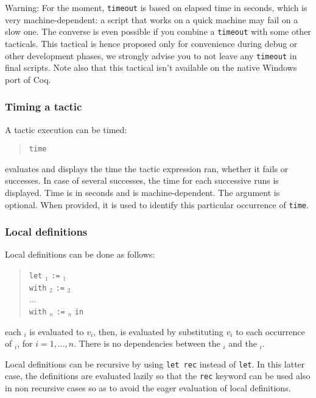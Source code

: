 Warning: For the moment, {\tt timeout} is based on elapsed time in
seconds, which is very
machine-dependent: a script that works on a quick machine may fail
on a slow one. The converse is even possible if you combine a
{\tt timeout} with some other tacticals. This tactical is hence
proposed only for convenience during debug or other development
phases, we strongly advise you to not leave any {\tt timeout} in
final scripts. Note also that this tactical isn't available on
the native Windows port of Coq.

\subsubsection{Timing a tactic
}

A tactic execution can be timed:
\begin{quote}
 {\tt time} {\qstring} {\tacexpr}
\end{quote}
evaluates {\tacexpr}
and displays the time the tactic expression ran, whether it fails or
successes. In case of several successes, the time for each successive
runs is displayed. Time is in seconds and is machine-dependent. The
{\qstring} argument is optional. When provided, it is used to identify
this particular occurrence of {\tt time}.

\subsubsection[Local definitions]{Local definitions
}

Local definitions can be done as follows:
\begin{quote}
{\tt let} {\ident}$_1$ {\tt :=} {\tacexpr}$_1$\\
{\tt with} {\ident}$_2$ {\tt :=} {\tacexpr}$_2$\\
...\\
{\tt with} {\ident}$_n$ {\tt :=} {\tacexpr}$_n$ {\tt in}\\
{\tacexpr}
\end{quote}
each {\tacexpr}$_i$ is evaluated to $v_i$, then, {\tacexpr} is
evaluated by substituting $v_i$ to each occurrence of {\ident}$_i$,
for $i=1,...,n$. There is no dependencies between the {\tacexpr}$_i$
and the {\ident}$_i$.

Local definitions can be recursive by using {\tt let rec} instead of
{\tt let}. In this latter case, the definitions are evaluated lazily
so that the {\tt rec} keyword can be used also in non recursive cases
so as to avoid the eager evaluation of local definitions.

